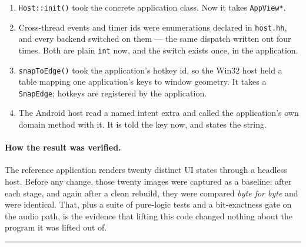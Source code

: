 \documentclass[11pt,a4paper]{article}
\begin{document}
\begin{enumerate}[leftmargin=*]
\item \texttt{Host::init()} took the concrete application class. Now it takes
  \texttt{AppView*}.
\item Cross-thread events and timer ids were enumerations declared in
  \texttt{host.hh}, and every backend switched on them --- the same dispatch
  written out four times. Both are plain \texttt{int} now, and the switch exists
  once, in the application.
\item \texttt{snapToEdge()} took the application's hotkey id, so the Win32 host
  held a table mapping one application's keys to window geometry. It takes a
  \texttt{SnapEdge}; hotkeys are registered by the application.
\item The Android host read a named intent extra and called the application's
  own domain method with it. It is told the key now, and states the string.
\end{enumerate}

\paragraph{How the result was verified.} The reference application renders
twenty distinct UI states through a headless host. Before any change, those
twenty images were captured as a baseline; after each stage, and again after a
clean rebuild, they were compared \emph{byte for byte} and were identical. That,
plus a suite of pure-logic tests and a bit-exactness gate on the audio path, is
the evidence that lifting this code changed nothing about the program it was
lifted out of.

\vfill
\begin{center}
\rule{0.4\textwidth}{0.4pt}
\end{center}
\end{document}
